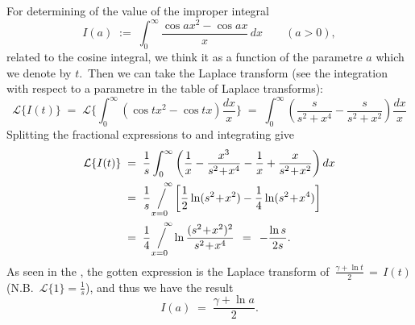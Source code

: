 \documentclass[12pt]{article}
\newcommand{\sijoitus}[2]%
{\operatornamewithlimits{\Big/}_{\!\!\!#1}^{\,#2}}
\begin{document}
For determining of the value of the improper integral
$$I(a) \;:=\; \int_0^\infty\frac{\cos{ax^2}-\cos{ax}}{x}\,dx \qquad (a > 0),$$
related to the cosine integral, we think it as a function of the parametre $a$ which we denote by $t$.\, Then we can take the Laplace transform (see the integration with respect to a parametre in the table of Laplace transforms):
$$\mathcal{L}\{I(t)\} \;=\; \mathcal{L}\{\int_0^\infty(\cos{tx^2}-\cos{tx})\frac{dx}{x}\} \;=\; 
\int_0^\infty\left(\frac{s}{s^2\!+\!x^4}-\frac{s}{s^2\!+\!x^2}\right)\frac{dx}{x}$$
Splitting the fractional expressions to  and integrating give
\begin{align*}
\mathcal{L}\{I(t)\} & \;=\; 
\frac{1}{s}\int_0^\infty\left(\frac{1}{x}-\frac{x^3}{s^2\!+\!x^4}-\frac{1}{x}+\frac{x}{s^2\!+\!x^2}\right)dx\\
 & \;=\; \frac{1}{s}\!\sijoitus{x=0}{\quad\infty}\left[\frac{1}{2}\ln(s^2\!+\!x^2)-\frac{1}{4}\ln(s^2\!+\!x^4)\right] \\
 & \;=\; \frac{1}{4}\!\sijoitus{x=0}{\quad\infty}\ln\frac{(s^2\!+\!x^2)^2}{s^2\!+\!x^4} 
   \;\,=\;\, -\frac{\ln{s}}{2s}.
\end{align*}
As seen in the , the gotten expression is the Laplace transform of\, 
$\displaystyle\frac{\gamma+\ln{t}}{2} \,=\, I(t)$\; (N.B.\, $\displaystyle\mathcal{L}\{1\} = \frac{1}{s}$), and thus we have the result
$$I(a) \;=\; \frac{\gamma+\ln{a}}{2}.$$
\end{document}
